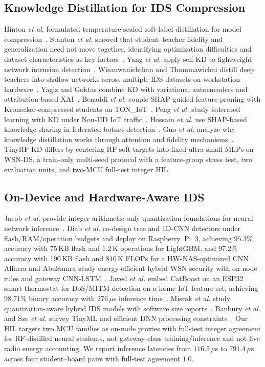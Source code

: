 \documentclass[journal]{IEEEtran}
\newcommand{\method}{TinyRF-KD}
\newcommand{\dataset}{WSN-DS}
\begin{document}
\subsection{Knowledge Distillation for IDS Compression}
Hinton \emph{et al.} formulated temperature-scaled soft-label distillation for model compression~\cite{hinton2015distilling}.
Stanton \emph{et al.} showed that student--teacher fidelity and generalization need not move together, identifying optimization difficulties and dataset characteristics as key factors~\cite{stanton2021kd}.
Yang \emph{et al.} apply self-KD to lightweight network intrusion detection~\cite{yang2023selfkd}.
Wisanwanichthan and Thammawichai distill deep teachers into shallow networks across multiple IDS datasets on workstation hardware~\cite{wisanwanichthan2025kd}.
Yagiz and Goktas combine KD with variational autoencoders and attribution-based XAI~\cite{yagiz2025lens}.
Benaddi \emph{et al.} couple SHAP-guided feature pruning with Kronecker-compressed students on TON\_IoT~\cite{benaddi2025lightweight}.
Peng \emph{et al.} study federated learning with KD under Non-IID IoT traffic~\cite{peng2025fdids}.
Hossain \emph{et al.} use SHAP-based knowledge sharing in federated botnet detection~\cite{hossain2025federatedkd}.
Guo \emph{et al.} analyze why knowledge distillation works through attention and fidelity mechanisms~\cite{guo2024whykd}.
\method{} differs by centering RF soft targets into fixed ultra-small MLPs on \dataset{}, a train-only multi-seed protocol with a feature-group stress test, two evaluation units, and two-MCU full-test integer HIL.

\subsection{On-Device and Hardware-Aware IDS}
Jacob \emph{et al.} provide integer-arithmetic-only quantization foundations for neural network inference~\cite{jacob2018integer}.
Diab \emph{et al.} co-design tree and 1D-CNN detectors under flash/RAM/operation budgets and deploy on Raspberry~Pi~3, achieving $95.3\%$ accuracy with 75\,KB flash and $1.2$\,K operations for LightGBM, and $97.2\%$ accuracy with 190\,KB flash and $840$\,K FLOPs for a HW-NAS-optimized CNN~\cite{diab2025hardware}.
Alfarra and AbuSamra study energy-efficient hybrid WSN security with on-node rules and gateway CNN-LSTM~\cite{alfarra2025energy}.
Javed \emph{et al.} embed CatBoost on an ESP32 smart thermostat for DoS/MITM detection on a home-IoT feature set, achieving $98.71\%$ binary accuracy with $276$\,$\mu$s inference time~\cite{javed2024thermostat}.
Misrak \emph{et al.} study quantization-aware hybrid IDS models with software size reports~\cite{misrak2025quantization}.
Banbury \emph{et al.} and Sze \emph{et al.} survey TinyML and efficient DNN processing constraints~\cite{banbury2021benchmarking,sze2017efficient}.
Our HIL targets two MCU families as on-node proxies with full-test integer agreement for RF-distilled neural students, not gateway-class training/inference and not live radio energy accounting.
We report inference latencies from $116.5$\,$\mu$s to $791.4$\,$\mu$s across four student--board pairs with full-test agreement $1.0$.
\end{document}
